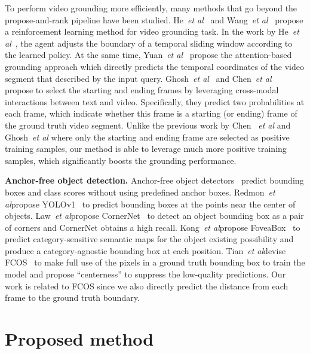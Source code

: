 \documentclass[10pt,twocolumn,letterpaper]{article}
\def\etal{\emph{et al}\onedot}
\begin{document}
	
To perform video grounding more efficiently, many methods that go beyond the propose-and-rank pipeline have been studied. He~\etal~\cite{he2019read} and  Wang~\etal~\cite{wang2019language} propose a reinforcement learning method for video grounding task. In the work by He~\etal~\cite{he2019read}, the agent adjusts the boundary of a temporal sliding window according to the learned policy. At the same time, Yuan~\etal~\cite{yuan2019to} propose the attention-based grounding approach which directly predicts the temporal coordinates of the video segment that described by the input query. Ghosh~\etal~\cite{ghosh2019excl} and Chen~\etal~\cite{chen2018temporally} propose to select the starting and ending frames by leveraging cross-modal interactions between text and video. Specifically, they predict two probabilities at each frame, which indicate whether this frame is a starting (or ending) frame of the ground truth video segment. Unlike the previous work by Chen ~\etal\cite{chen2018temporally} and Ghosh~\etal\cite{ghosh2019excl} where only the starting and ending frame are selected as positive training samples, our method is able to leverage much more positive training samples, which significantly boosts the grounding performance.
	
	
	
	\noindent \textbf{Anchor-free object detection.}
	Anchor-free object detectors~\cite{huang2015densebox,redmon2016you,tian2019fcos,law2018cornernet,kong2019foveabox} predict bounding boxes and class scores without using predefined anchor boxes. Redmon~\etal propose YOLOv1~\cite{redmon2016you} to predict bounding boxes at the points near the center of objects. Law~\etal propose CornerNet~\cite{law2018cornernet} to detect an object bounding box as a pair of corners and CornerNet obtains a high recall. Kong~\etal propose FoveaBox~\cite{kong2019foveabox} to predict category-sensitive semantic maps for the object existing possibility and produce a category-agnostic bounding box at each position. 
	Tian~\etal devise FCOS~\cite{tian2019fcos} to make full use of the pixels in a ground truth bounding box to train the model and propose “centerness” to suppress the low-quality predictions. Our work is related to FCOS since we also directly predict the distance from each frame to the ground truth boundary.
	
	
	
	\section{Proposed method}
	
\end{document}
